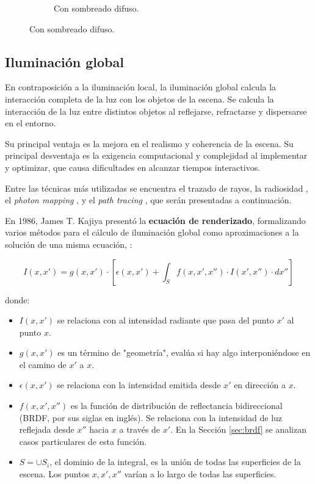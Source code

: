 \begin{figure}
\begin{center}
\begin{subfigure}{.49\textwidth}
        \caption{Con sombreado difuso.}
    \end{subfigure}
    \label{fig:sphere-blinn-phong}
    \end{center}
\end{figure}

\subsection{Iluminación global}

En contraposición a la iluminación local, la iluminación global calcula la interacción completa de la luz con los objetos de la escena.
Se calcula la interacción de la luz entre distintos objetos al reflejarse, refractarse y dispersarse en el entorno.

Su principal ventaja es la mejora en el realismo y coherencia de la escena.
Su principal desventaja es la exigencia computacional y complejidad al implementar y optimizar, que causa dificultades en alcanzar tiempos interactivos.

Entre las técnicas más utilizadas se encuentra el trazado de rayos, la radiosidad \cite[p.~442]{rtr}, el \textit{photon mapping} \cite{photon-mapping}, y el \textit{path tracing} \cite{rendering-equation}, que serán presentadas a continuación.

En 1986, James T. Kajiya presentó la \textbf{ecuación de renderizado}, formalizando varios métodos para el cálculo de iluminación global como aproximaciones a la solución de una misma ecuación, \cite{rendering-equation}:

\begin{equation}\label{eq:rendering-equation}
    I(x, x') = g(x, x') \cdot \left[\epsilon(x, x') + \int_S f(x, x', x'') \cdot I(x', x'') \cdot dx'' \right]
\end{equation}

donde:
\begin{itemize}
    \item $I(x, x')$ se relaciona con al intensidad radiante que pasa del punto $x'$ al punto $x$.
    \item $g(x, x')$ es un término de "geometría", evalúa si hay algo interponiéndose en el camino de $x'$ a $x$.
    \item $\epsilon(x, x')$ se relaciona con la intensidad emitida desde $x'$ en dirección a $x$.
    \item $f(x, x', x'')$ es la función de distribución de reflectancia bidireccional (BRDF, por sus siglas en inglés). Se relaciona con la intensidad de luz reflejada desde $x''$ hacia $x$ a través de $x'$. En la Sección \ref{sec:brdf} se analizan casos particulares de esta función.
    \item $S = \cup{S_i}$, el dominio de la integral, es la unión de todas las superficies de la escena. Los puntos $x, x', x''$ varían a lo largo de todas las superficies.
\end{itemize}

